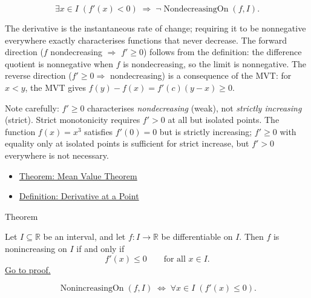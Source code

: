 \begin{remark*}
\[
\exists x \in I\;(f'(x) < 0) \;\Rightarrow\; \lnot\operatorname{NondecreasingOn}(f,I).
\]
\end{remark*}

\begin{remark*}[Interpretation]
The derivative is the instantaneous rate of change; requiring it to be nonnegative everywhere exactly characterises functions that never decrease. The forward direction ($f$ nondecreasing $\Rightarrow$ $f' \geq 0$) follows from the definition: the difference quotient is nonnegative when $f$ is nondecreasing, so the limit is nonnegative. The reverse direction ($f' \geq 0 \Rightarrow$ nondecreasing) is a consequence of the MVT: for $x < y$, the MVT gives $f(y)-f(x) = f'(c)(y-x) \geq 0$.

Note carefully: $f' \geq 0$ characterises \emph{nondecreasing} (weak), not \emph{strictly increasing} (strict). Strict monotonicity requires $f' > 0$ at all but isolated points. The function $f(x) = x^3$ satisfies $f'(0) = 0$ but is strictly increasing; $f' \geq 0$ with equality only at isolated points is sufficient for strict increase, but $f' > 0$ everywhere is not necessary.
\end{remark*}

\begin{dependencies}
\begin{itemize}
  \item \hyperref[thm:mean-value-theorem]{Theorem: Mean Value Theorem}
  \item \hyperref[def:derivative-at-a-point]{Definition: Derivative at a Point}
\end{itemize}
\end{dependencies}


\begin{theorembox}{Theorem}
\begin{theorem}
\label{thm:nonincreasing-iff-nonpos-derivative}
Let $I \subseteq \mathbb{R}$ be an interval, and let $f : I \to \mathbb{R}$ be differentiable on $I$. Then $f$ is nonincreasing on $I$ if and only if
\[
f'(x) \leq 0 \qquad \text{for all } x \in I.
\]
\hyperref[prf:nonincreasing-iff-nonpos-derivative]{Go to proof.}
\end{theorem}
\end{theorembox}

\begin{remark*}
\[
\operatorname{NonincreasingOn}(f,I)
\;\iff\;
\forall x \in I\;(f'(x) \leq 0).
\]
\end{remark*}

